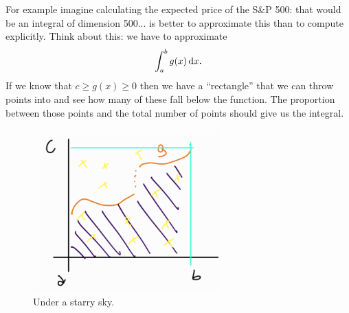 \documentclass[12pt]{report}
\begin{document}
For example imagine calculating the expected price of the S\&P 500: that would be an integral of dimension 500... is better to approximate this than to compute explicitly.
Think about this: we have to approximate
	\begin{equation*}
		\int_{a}^{b}g(x)\mathop{}\!\mathrm{d} x.
	\end{equation*}
	If we know that $c\geq g(x)\geq0$ then we have a ``rectangle'' that we can throw points into and see how many of these fall below the function. The proportion between those points and the total number of points should give us the integral.
	\begin{figure}[H]
		\centering
		\includegraphics[width=0.5\linewidth]{img/screenshot063}
		\caption{Under a starry sky.}
		\label{fig:screenshot063}
	\end{figure}
\end{document}
